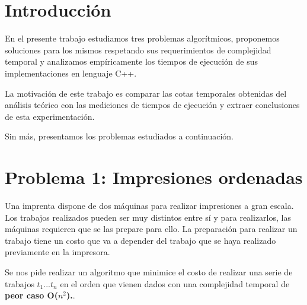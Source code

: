 \documentclass[a4paper, 10pt, twoside]{article}
\begin{document}
\newpage




\tableofcontents

\newpage




\section{Introducción}

En el presente trabajo estudiamos tres problemas algorítmicos, proponemos soluciones para los mismos respetando sus requerimientos de complejidad temporal y analizamos empíricamente los tiempos de ejecución de sus implementaciones en lenguaje C++.

La motivación de este trabajo es comparar las cotas temporales obtenidas del análisis teórico con las mediciones de tiempos de ejecución y extraer conclusiones de esta experimentación.

Sin más, presentamos los problemas estudiados a continuación.



\newpage

\section{Problema 1: Impresiones ordenadas}

Una imprenta dispone de dos máquinas para realizar impresiones a gran escala. Los trabajos realizados pueden ser muy distintos entre sí y para realizarlos, las máquinas requieren que se las prepare para ello. La preparación para realizar un trabajo tiene un costo que va a depender del trabajo que se haya realizado previamente en la impresora.

Se nos pide realizar un algoritmo que minimice el costo de realizar una serie de trabajos $t_1$...$t_n$ en el orden que vienen dados con una complejidad temporal de \textbf{peor caso O($n^2$).}.
\end{document}
